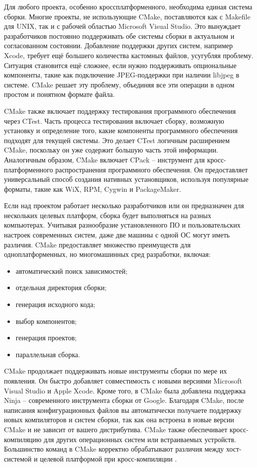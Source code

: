 Для любого проекта, особенно кроссплатформенного, необходима единая система сборки. Многие проекты, не использующие CMake, поставляются как с Makefile для UNIX, так и с рабочей областью Microsoft Visual Studio. Это вынуждает разработчиков постоянно поддерживать обе системы сборки в актуальном и согласованном состоянии. Добавление поддержки других систем, например Xcode, требует ещё большего количества кастомных файлов, усугубляя проблему. Ситуация становится ещё сложнее, если нужно поддерживать опциональные компоненты, такие как подключение JPEG-поддержки при наличии libjpeg в системе. CMake решает эту проблему, объединяя все эти операции в одном простом и понятном формате файла.

CMake также включает поддержку тестирования программного обеспечения через CTest. Часть процесса тестирования включает сборку, возможную установку и определение того, какие компоненты программного обеспечения подходят для текущей системы. Это делает CTest логичным расширением CMake, поскольку он уже содержит большую часть этой информации. Аналогичным образом, CMake включает CPack -- инструмент для кросс-платформенного распространения программного обеспечения. Он предоставляет универсальный способ создания нативных установщиков, используя популярные форматы, такие как WiX, RPM, Cygwin и PackageMaker.

Если над проектом работает несколько разработчиков или он предназначен для нескольких целевых платформ, сборка будет выполняться на разных компьютерах. Учитывая разнообразие установленного ПО и пользовательских настроек современных систем, даже две машины с одной ОС могут иметь различия. CMake предоставляет множество преимуществ для одноплатформенных, но многомашинных сред разработки, включая:
\begin{itemize}
	\item автоматический поиск зависимостей;
	\item отдельная директория сборки;
	\item генерация исходного кода;
	\item выбор компонентов;
	\item генерация проектов;
	\item параллельная сборка.
\end{itemize}

CMake продолжает поддерживать новые инструменты сборки по мере их появления. Он быстро добавляет совместимость с новыми версиями Microsoft Visual Studio и Apple Xcode. Кроме того, в CMake была добавлена поддержка Ninja -- современного инструмента сборки от Google. Благодаря CMake, после написания конфигурационных файлов вы автоматически получаете поддержку новых компиляторов и систем сборки, так как она встроена в новые версии CMake и не зависит от вашего дистрибутива. CMake также обеспечивает кросс-компиляцию для других операционных систем или встраиваемых устройств. Большинство команд в CMake корректно обрабатывают различия между хост-системой и целевой платформой при кросс-компиляции \cite{CMake}.

